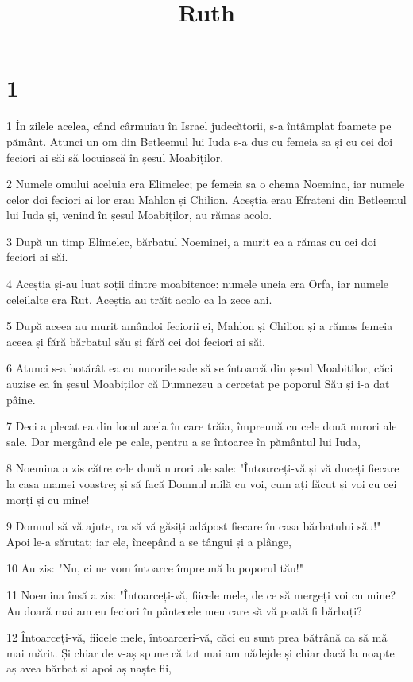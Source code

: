 

\title{Ruth}


\chapter{1}

\par 1 În zilele acelea, când cârmuiau în Israel judecătorii, s-a întâmplat foamete pe pământ. Atunci un om din Betleemul lui Iuda s-a dus cu femeia sa și cu cei doi feciori ai săi să locuiască în șesul Moabiților.
\par 2 Numele omului aceluia era Elimelec; pe femeia sa o chema Noemina, iar numele celor doi feciori ai lor erau Mahlon și Chilion. Aceștia erau Efrateni din Betleemul lui Iuda și, venind în șesul Moabiților, au rămas acolo.
\par 3 După un timp Elimelec, bărbatul Noeminei, a murit ea a rămas cu cei doi feciori ai săi.
\par 4 Aceștia și-au luat soții dintre moabitence: numele uneia era Orfa, iar numele celeilalte era Rut. Aceștia au trăit acolo ca la zece ani.
\par 5 După aceea au murit amândoi feciorii ei, Mahlon și Chilion și a rămas femeia aceea și fără bărbatul său și fără cei doi feciori ai săi.
\par 6 Atunci s-a hotărât ea cu nurorile sale să se întoarcă din șesul Moabiților, căci auzise ea în șesul Moabiților că Dumnezeu a cercetat pe poporul Său și i-a dat pâine.
\par 7 Deci a plecat ea din locul acela în care trăia, împreună cu cele două nurori ale sale. Dar mergând ele pe cale, pentru a se întoarce în pământul lui Iuda,
\par 8 Noemina a zis către cele două nurori ale sale: "Întoarceți-vă și vă duceți fiecare la casa mamei voastre; și să facă Domnul milă cu voi, cum ați făcut și voi cu cei morți și cu mine!
\par 9 Domnul să vă ajute, ca să vă găsiți adăpost fiecare în casa bărbatului său!" Apoi le-a sărutat; iar ele, începând a se tângui și a plânge,
\par 10 Au zis: "Nu, ci ne vom întoarce împreună la poporul tău!"
\par 11 Noemina însă a zis: "Întoarceți-vă, fiicele mele, de ce să mergeți voi cu mine? Au doară mai am eu feciori în pântecele meu care să vă poată fi bărbați?
\par 12 Întoarceți-vă, fiicele mele, întoarceri-vă, căci eu sunt prea bătrână ca să mă mai mărit. Și chiar de v-aș spune că tot mai am nădejde și chiar dacă la noapte aș avea bărbat și apoi aș naște fii,
